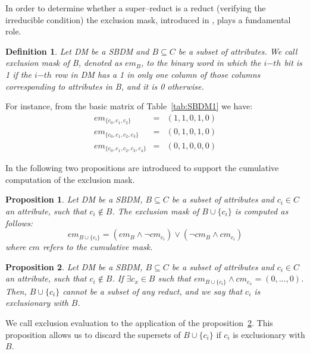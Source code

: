 \documentclass[number,preprint,review,12pt]{elsarticle}
\newtheorem{proposition}{Proposition}
\newtheorem{definition}{Definition}
\begin{document}
	In order to determine whether a super--reduct is a reduct (verifying the irreducible condition) the
	exclusion mask, introduced in \cite{Lias09}, plays a fundamental role. 
	
	\begin{definition}\label{def:exclusion}
		Let DM be a SBDM and $B \subseteq C$ be a subset of attributes. We call exclusion mask of B, denoted as $em_B$, to the binary word in which the $i{\mathit{-th}}$ bit is 1 if the $i{\mathit{-th}}$ row in DM has a 1 in only one column of those columns corresponding to attributes in B, and it is 0 otherwise.
	\end{definition}
	
	For instance, from the basic matrix of Table~\ref{tab:SBDM1} we have:
	$$\begin{array}{lcc}
	  em_{\lbrace c_0,c_1,c_2\rbrace}         &=& (1,1,0,1,0)\\
	  em_{\lbrace c_0,c_1,c_2,c_3\rbrace}     &=& (0,1,0,1,0)\\
	  em_{\lbrace c_0,c_1,c_2,c_3,c_4\rbrace} &=& (0,1,0,0,0)
	\end{array}$$
	
	In \cite{Lias13} the following two propositions are introduced to support the cumulative computation of the exclusion mask.
	
	\begin{proposition}\label{prop:cumul} 
		Let DM be a SBDM, $B \subseteq C$ be a subset of attributes and $c_i \in C$ an attribute, such that $c_i \notin B$. The exclusion mask of $B \cup \lbrace c_i\rbrace$ is computed as follows: $$em_{B \cup \lbrace c_i\rbrace}=(em_B \wedge \neg cm_{c_i}) \vee (\neg cm_B \wedge cm_{c_i})$$ where $cm$ refers to the cumulative mask.
	\end{proposition}
	
	
	\begin{proposition}\label{prop:exclude} 
		Let DM be a SBDM, $B \subseteq C$ be a subset of attributes and $c_i \in C$ an attribute, such that $c_i \notin B$. If $\exists c_x \in B$ such that $em_{B \cup \lbrace c_i\rbrace} \wedge cm_{c_x}=(0,...,0)$. Then, $B \cup \lbrace c_i\rbrace$ cannot be a subset of any reduct, and we say that $c_i$ is exclusionary with $B$.
	\end{proposition}
	
	We call exclusion evaluation to the application of the proposition~\ref{prop:exclude}. This proposition allows us to discard the supersets of $B \cup \lbrace c_i\rbrace$ if $c_i$ is exclusionary with $B$.
	
\end{document}
